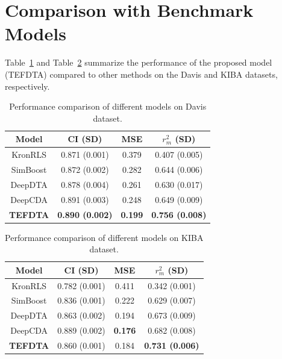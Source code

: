 \documentclass{article}
\begin{document}
\section{Comparison with Benchmark Models}
Table~\ref{tab:comparison_davis} and Table~\ref{tab:comparison_kiba} summarize the performance of the proposed model (TEFDTA) compared to other methods on the Davis and KIBA datasets, respectively.

\begin{table}[ht]
	\centering
	\caption{Performance comparison of different models on Davis dataset.}
	\label{tab:comparison_davis}
	\begin{tabular}{cccc}
		\toprule
		\textbf{Model} & \textbf{CI (SD)} & \textbf{MSE} & \textbf{$r_m^2$ (SD)} \\
		\midrule
		KronRLS   & 0.871 (0.001) & 0.379 & 0.407 (0.005) \\
		SimBoost  & 0.872 (0.002) & 0.282 & 0.644 (0.006) \\
		DeepDTA   & 0.878 (0.004) & 0.261 & 0.630 (0.017) \\
		DeepCDA   & 0.891 (0.003) & 0.248 & 0.649 (0.009) \\
		\textbf{TEFDTA} & \textbf{0.890 (0.002)} & \textbf{0.199} & \textbf{0.756 (0.008)} \\
		\bottomrule
	\end{tabular}
\end{table}

\begin{table}[ht]
	\centering
	\caption{Performance comparison of different models on KIBA dataset.}
	\label{tab:comparison_kiba}
	\begin{tabular}{cccc}
		\toprule
		\textbf{Model} & \textbf{CI (SD)} & \textbf{MSE} & \textbf{$r_m^2$ (SD)} \\
		\midrule
		KronRLS   & 0.782 (0.001) & 0.411 & 0.342 (0.001) \\
		SimBoost  & 0.836 (0.001) & 0.222 & 0.629 (0.007) \\
		DeepDTA   & 0.863 (0.002) & 0.194 & 0.673 (0.009) \\
		DeepCDA   & 0.889 (0.002) & \textbf{0.176} & 0.682 (0.008) \\
		\textbf{TEFDTA} & 0.860 (0.001) & 0.184 & \textbf{0.731 (0.006)} \\
		\bottomrule
	\end{tabular}
\end{table}

\end{document}
